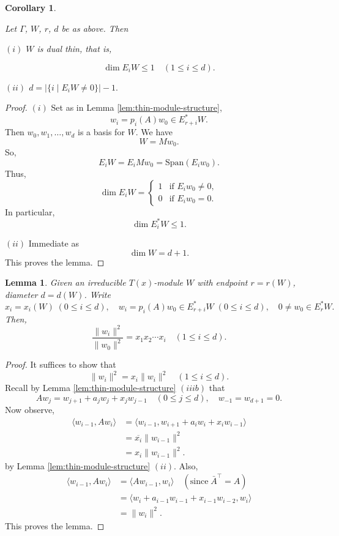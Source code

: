 \documentclass[
]{book}
\newtheorem{lemma}{Lemma}[chapter]
\newtheorem{corollary}{Corollary}[chapter]
\theoremstyle{definition}
\theoremstyle{definition}
\theoremstyle{definition}
\theoremstyle{definition}
\theoremstyle{remark}
\begin{document}
\begin{corollary}
\protect\hypertarget{cor:thin-is-dualthin}{}\label{cor:thin-is-dualthin}

Let \(\Gamma\), \(W\), \(r\), \(d\) be as above. Then

\((i)\) \(W\) is dual thin, that is,

\[\dim E_iW \leq 1 \quad (1\leq i \leq d).\]

\((ii)\) \(d = |\{i \mid E_iW \neq 0\}| - 1.\)

\end{corollary}

\begin{proof}
\((i)\) Set as in Lemma \ref{lem:thin-module-structure},
\[w_i = p_i(A)w_0\in E^*_{r+i}W.\]
Then \(w_0, w_1, \ldots, w_d\) is a basis for \(W\). We have
\[W = Mw_0.\]
So,
\[E_iW = E_iMw_0 = \mathrm{Span}(E_iw_0).\]
Thus,
\[\dim E_iW = \begin{cases}1 & \text{if } E_iw_0\neq 0,\\ 0 & \text{if }E_iw_0 = 0.\end{cases}\]
In particular,
\[\dim E^*_iW \leq 1.\]

\((ii)\) Immediate as
\[\dim W = d+1.\]
This proves the lemma.
\end{proof}

\begin{lemma}
\protect\hypertarget{lem:measure-wi}{}\label{lem:measure-wi}Given an irreducible \(T(x)\)-module \(W\) with endpoint \(r = r(W)\), diameter \(d = d(W)\). Write
\[x_i = x_i(W) \; (0\leq i\leq d), \quad w_i = p_i(A)w_0\in E^*_{r+i}W \; (0\leq i\leq d), \quad 0\neq w_0 \in E^*_rW.\]
Then,
\[\frac{\|w_i\|^2}{\|w_0\|^2} = x_1x_2\cdots x_i \quad (1\leq i\leq d).\]
\end{lemma}

\begin{proof}
It suffices to show that
\[\|w_i\|^2 = x_i\|w_i\|^2 \quad (1\leq i\leq d).\]
Recall by Lemma \ref{lem:thin-module-structure} \((iiib)\) that
\[Aw_j = w_{j+1} + a_jw_j + x_jw_{j-1} \quad (0\leq j\leq d), \quad w_{-1} = w_{d+1} = 0.\]
Now observe,
\begin{align}
\langle w_{i-1}, Aw_i\rangle & = \langle w_{i-1}, w_{i+1}+ a_iw_i + x_iw_{i-1}\rangle\\
& = \overline{x_i}\|w_{i-1}\|^2\\
& = x_i\|w_{i-1}\|^2.
\end{align}
by Lemma \ref{lem:thin-module-structure} \((ii)\).
Also,
\begin{align}
\langle w_{i-1}, Aw_i\rangle & = \langle Aw_{i-1}, w_i\rangle \quad (\text{since}\; \bar{A}^\top = A)\\
& = \langle w_i + a_{i-1}w_{i-1} + x_{i-1}w_{i-2}, w_i\rangle\\
& = \|w_i\|^2.
\end{align}
This proves the lemma.
\end{proof}
\end{document}
